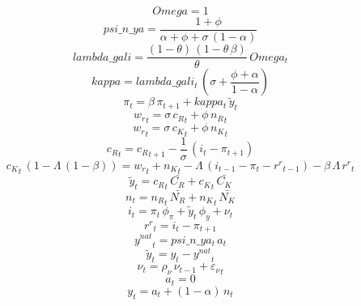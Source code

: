 \begin{dmath*}
Omega = 1
\end{dmath*}
\begin{dmath*}
psi\_n\_ya = \frac{1+{{\phi}}}{{{\alpha}}+{{\phi}}+{{\sigma}}\, \left(1-{{\alpha}}\right)}
\end{dmath*}
\begin{dmath*}
lambda\_gali = \frac{\left(1-{{\theta}}\right)\, \left(1-{{\theta}}\, {{\beta}}\right)}{{{\theta}}}\, {Omega_{t}}
\end{dmath*}
\begin{dmath*}
kappa = {lambda\_gali_{t}}\, \left({{\sigma}}+\frac{{{\phi}}+{{\alpha}}}{1-{{\alpha}}}\right)
\end{dmath*}
\begin{dmath}
{{\pi}_{t}}={{\beta}}\, {{\pi}_{t+1}}+{kappa_{t}}\, {{\tilde y}_{t}}
\end{dmath}
\begin{dmath}
{{w_r}_{t}}={{\sigma}}\, {{c_R}_{t}}+{{\phi}}\, {{n_R}_{t}}
\end{dmath}
\begin{dmath}
{{w_r}_{t}}={{\sigma}}\, {{c_K}_{t}}+{{\phi}}\, {{n_K}_{t}}
\end{dmath}
\begin{dmath}
{{c_R}_{t}}={{c_R}_{t+1}}-\frac{1}{{{\sigma}}}\, \left({{i}_{t}}-{{\pi}_{t+1}}\right)
\end{dmath}
\begin{dmath}
{{c_K}_{t}}\, \left(1-{{\Lambda}}\, \left(1-{{\beta}}\right)\right)={{w_r}_{t}}+{{n_K}_{t}}-{{\Lambda}}\, \left({{i}_{t-1}}-{{\pi}_{t}}-{{r^r}_{t-1}}\right)-{{\beta}}\, {{\Lambda}}\, {{r^r}_{t}}
\end{dmath}
\begin{dmath}
{{\tilde y}_{t}}={{c_R}_{t}}\, {\bar{C_R}}+{{c_K}_{t}}\, {\bar{C_K}}
\end{dmath}
\begin{dmath}
{{n}_{t}}={{n_R}_{t}}\, {\bar{N_R}}+{{n_K}_{t}}\, {\bar{N_K}}
\end{dmath}
\begin{dmath}
{{i}_{t}}={{\pi}_{t}}\, {{\phi_{\pi}}}+{{\tilde y}_{t}}\, {{\phi_{y}}}+{{\nu}_{t}}
\end{dmath}
\begin{dmath}
{{r^r}_{t}}={{i}_{t}}-{{\pi}_{t+1}}
\end{dmath}
\begin{dmath}
{{y^{nat}}_{t}}={psi\_n\_ya_{t}}\, {{a}_{t}}
\end{dmath}
\begin{dmath}
{{\tilde y}_{t}}={{y}_{t}}-{{y^{nat}}_{t}}
\end{dmath}
\begin{dmath}
{{\nu}_{t}}={{\rho_{\nu}}}\, {{\nu}_{t-1}}+{{\varepsilon_\nu}_{t}}
\end{dmath}
\begin{dmath}
{{a}_{t}}=0
\end{dmath}
\begin{dmath}
{{y}_{t}}={{a}_{t}}+\left(1-{{\alpha}}\right)\, {{n}_{t}}
\end{dmath}
